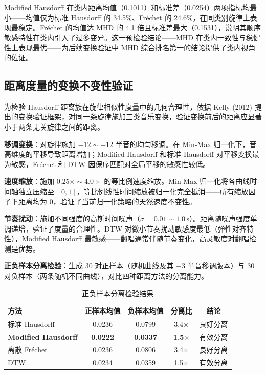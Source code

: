 \documentclass[withoutpreface]{cumcmthesis}
\begin{document}
Modified Hausdorff 在类内距离均值（0.1011）和标准差（0.0254）两项指标均最小——均值仅为标准 Hausdorff 的 34.5\%、Fréchet 的 24.6\%，在同类别旋律上表现最稳定。Fréchet 的均值达 MHD 的 4.1 倍且标准差最大（0.1531），说明其顺序敏感特性在类内引入了过多变异。这一预检验结论——MHD 在类内一致性与稳健性上表现最优——为后续变换验证中 MHD 综合排名第一的结论提供了类内视角的佐证。

\subsection{距离度量的变换不变性验证}

为检验 Hausdorff 距离族在旋律相似性度量中的几何合理性，依据 Kelly (2012) 提出的变换验证框架，对同一条旋律施加三类音乐变换，验证变换前后的距离应显著小于两条无关旋律之间的距离。

\textbf{移调变换}：对旋律施加 $-12 \sim +12$ 半音的均匀移调。在 Min-Max 归一化下，音高维度的平移导致距离增加；Modified Hausdorff 和标准 Hausdorff 对平移变换最为敏感，Fréchet 和 DTW 因保序匹配对全局平移的敏感性较低。

\textbf{速度缩放}：施加 $0.25\times \sim 4.0\times$ 的等比例速度缩放。Min-Max 归一化将各曲线时间轴独立压缩至 $[0,1]$，等比例线性时间缩放被归一化完全抵消——所有缩放因子下距离均为 0，验证了当前归一化策略的天然速度不变性。

\textbf{节奏扰动}：施加不同强度的高斯时间噪声（$\sigma = 0.01 \sim 1.0$\,s）。距离随噪声强度单调递增，验证了度量的合理性。DTW 对微小节奏扰动敏感度最低（弹性对齐特性），Modified Hausdorff 最敏感——翻唱通常伴随节奏变化，高灵敏度对翻唱检测是优势。

\textbf{正负样本分离检验}：生成 30 对正样本（随机曲线及其 $+3$ 半音移调版本）与 30 对负样本（两条随机不同曲线），对比四种距离方法的分离能力。

\begin{table}[htbp]
    \centering
    \caption{正负样本分离检验结果}
    \label{tab:pn_separation}
    \begin{tabular}{lcccc}
        \toprule
        \textbf{方法} & \textbf{正样本均值} & \textbf{负样本均值} & \textbf{分离比} & \textbf{结论} \\
        \midrule
        标准 Hausdorff & 0.0236 & 0.0799 & 3.4$\times$ & 良好分离 \\
        \textbf{Modified Hausdorff} & \textbf{0.0222} & \textbf{0.0337} & \textbf{1.5$\times$} & 有效分离 \\
        离散 Fr\'{e}chet & 0.0236 & 0.0806 & 3.4$\times$ & 良好分离 \\
        DTW & 0.0234 & 0.0359 & 1.5$\times$ & 有效分离 \\
        \bottomrule
    \end{tabular}
\end{table}
\end{document}
